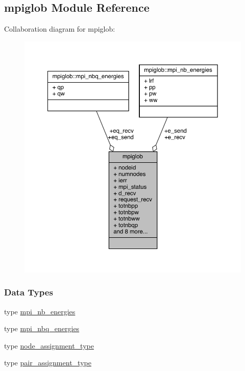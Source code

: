 \hypertarget{classmpiglob}{\subsection{mpiglob Module Reference}
\label{classmpiglob}
}


Collaboration diagram for mpiglob\-:
\nopagebreak
\begin{figure}[H]
\begin{center}
\leavevmode
\includegraphics[width=350pt]{classmpiglob__coll__graph}
\end{center}
\end{figure}
\subsubsection*{Data Types}
\begin{DoxyCompactItemize}
\item 
type \hyperlink{structmpiglob_1_1mpi__nb__energies}{mpi\-\_\-nb\-\_\-energies}
\item 
type \hyperlink{structmpiglob_1_1mpi__nbq__energies}{mpi\-\_\-nbq\-\_\-energies}
\item 
type \hyperlink{structmpiglob_1_1node__assignment__type}{node\-\_\-assignment\-\_\-type}
\item 
type \hyperlink{structmpiglob_1_1pair__assignment__type}{pair\-\_\-assignment\-\_\-type}
\end{DoxyCompactItemize}
